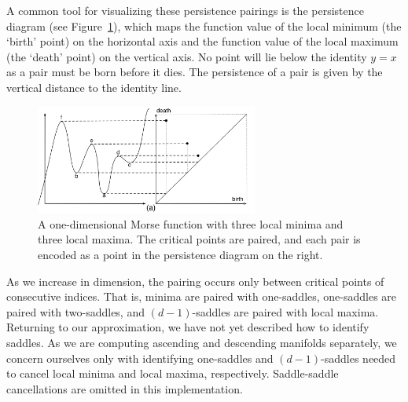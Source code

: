 A common tool for visualizing these persistence pairings is the persistence diagram (see Figure~\ref{fig:persistenceDiagram}), which maps the function value of the local minimum (the `birth' point) on the horizontal axis and the function value of the local maximum (the `death' point) on the vertical axis.
%
No point will lie below the identity $y=x$ as a pair must be born before it dies.
%
The persistence of a pair is given by the vertical distance to the identity line.

\begin{figure}[b]
  \centering
  \includegraphics[width=0.65\textwidth]{figs/chap4/persistence-diagram}
  \caption[A one-dimensional function and its persistence diagram]{A one-dimensional Morse function with three local minima and three local maxima.
  The critical points are paired, and each pair is encoded as a point in the persistence diagram on the right.}
  \label{fig:persistenceDiagram}
\end{figure}

As we increase in dimension, the pairing occurs only between critical points of consecutive indices.
%
That is, minima are paired with one-saddles, one-saddles are paired with two-saddles, and $(d-1)$-saddles are paired with local maxima.
%
Returning to our approximation, we have not yet described how to identify saddles.
%
As we are computing ascending and descending manifolds separately, we concern ourselves only with identifying one-saddles and $(d-1)$-saddles needed to cancel local minima and local maxima, respectively.
%
Saddle-saddle cancellations are omitted in this implementation.

